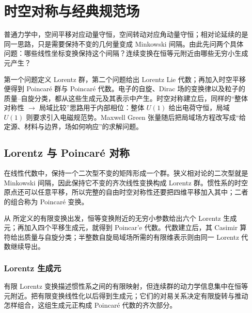 \chapter{时空对称与经典规范场}\label{chap:classical-fields}

普通力学中，空间平移对应动量守恒，空间转动对应角动量守恒；相对论延续的是同一思路，只是需要保持不变的几何量变成 Minkowski 间隔。由此先问两个具体问题：哪些线性坐标变换保持这个间隔？连续变换在恒等元附近由哪些无穷小生成元产生？

第一个问题定义 Lorentz 群，第二个问题给出 Lorentz Lie 代数；再加入时空平移便得到 Poincaré 群与 Poincaré 代数。电子的自旋、Dirac 场的变换律以及粒子的质量--自旋分类，都从这些生成元及其表示中产生。时空对称建立后，同样的“整体对称性 $\rightarrow$ 局域比较”思路用于内部相位：整体 $U(1)$ 给出电荷守恒，局域 $U(1)$ 则要求引入电磁规范势。Maxwell Green 张量随后把局域场方程改写成“给定源、材料与边界，场如何响应”的求解问题。

\section{Lorentz 与 Poincar\'e 对称}

在线性代数中，保持一个二次型不变的矩阵形成一个群。狭义相对论的二次型就是 Minkowski 间隔，因此保持它不变的齐次线性变换构成 Lorentz 群。惯性系的时空原点还可以任意平移，所以完整的自由时空对称性还要把四维平移加入其中；二者的组合称为 Poincar\'e 变换。

从 所定义的有限变换出发，恒等变换附近的无穷小参数给出六个 Lorentz 生成元；再加入四个平移生成元，就得到 Poincar'e 代数。代数建立后，其 Casimir 算符给出质量与自旋分类；半整数自旋局域场所需的有限维表示则由同一 Lorentz 代数继续导出。

\subsection{Lorentz 生成元}

有限 Lorentz 变换描述惯性系之间的有限映射，但连续群的动力学信息集中在恒等元附近。把有限变换线性化以后得到生成元；它们的对易关系决定有限旋转与推动怎样组合，这组生成元正构成 Poincar\'e 代数的齐次部分。



